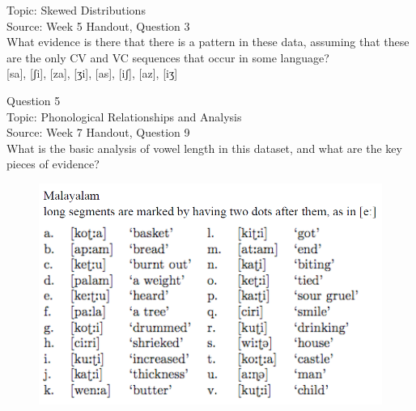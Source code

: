 \documentclass[12pt]{article}
\begin{document}
Topic: Skewed Distributions\\
Source: Week 5 Handout, Question 3\\

What evidence is there that there is a pattern in these data, assuming that these are the only CV and VC sequences that occur in some language?\\

{[sa]}, {[ʃi]}, {[za]}, {[ʒi]}, {[as]}, {[iʃ]}, {[az]}, {[iʒ]}


\newpage

{\large Question 5}\\

Topic: Phonological Relationships and Analysis\\
Source: Week 7 Handout, Question 9\\

What is the basic analysis of vowel length in this dataset, and what are the key pieces of evidence?\\

\begin{figure}[H]
\includegraphics{../images/malayalam.png}
\end{figure}

\newpage

\begin{center}
\textbf{{\color{red}{\HUGE END OF EXAM}}}\\

\end{center}
\newpage

\begin{center}
\textbf{{\color{blue}{\HUGE START OF EXAM\\}}}

\textbf{{\color{blue}{\HUGE Student ID: 16922\\}}}

\textbf{{\color{blue}{\HUGE \\}}}

\end{center}
\newpage
\end{document}
